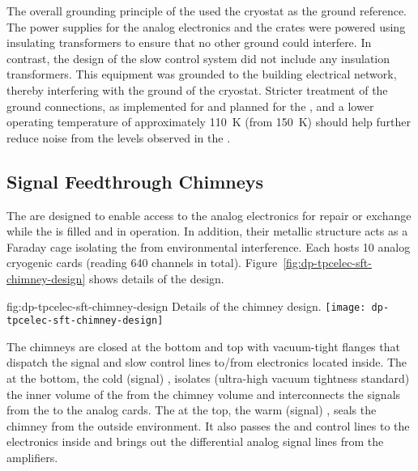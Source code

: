 The overall grounding principle of the  used the cryostat as the ground reference. The  power supplies for the  analog electronics and the  crates were powered using insulating transformers to ensure that no other ground could interfere. In contrast, the design of the slow control system did not include any insulation transformers. This equipment was grounded to the building electrical network, thereby interfering with the ground of the cryostat. Stricter treatment of the ground connections, as implemented for  and planned for the , and a lower  operating temperature of approximately \SI{110}{\kelvin} (from \SI{150}{\kelvin}) should help further reduce noise from the levels observed in the .


\subsection{Signal Feedthrough Chimneys}
\label{ssec:dp-tpcelec-design-sft}

The  are designed to enable access to the  analog electronics for repair or exchange while the  is filled and in operation. In addition, their metallic structure acts as a Faraday cage isolating the   from environmental interference.  Each  hosts \num{10} analog cryogenic  cards (reading \num{640} channels in total). Figure~\ref{fig:dp-tpcelec-sft-chimney-design} shows details of the design. 

\begin{dunefigure}{fig:dp-tpcelec-sft-chimney-design}
{Details of the  chimney design.}
\texttt{[image: dp-tpcelec-sft-chimney-design]}
\end{dunefigure}

The chimneys are closed at the bottom and top with vacuum-tight \fdth flanges that dispatch the signal and slow control lines to/from  electronics located inside. The \fdth at the bottom, the cold (signal) \fdth, isolates (ultra-high vacuum tightness standard) the inner volume of the  from the chimney volume and interconnects the signals from the  to the analog  cards. The \fdth at the top, the warm (signal) \fdth, seals the chimney from the outside environment. It also passes the  and control lines to the  electronics inside and brings out the differential analog signal lines from the  amplifiers. 

